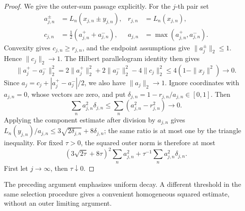 \begin{proof}
We give the outer-sum passage explicitly. For the \(j\)-th pair set
\begin{align*}
 a_{j,n}^\pm&=L_n(x_{j,n}\pm y_{j,n}),
 &r_{j,n}&=L_n(x_{j,n}),\\
 c_{j,n}&=\tfrac12(a_{j,n}^++a_{j,n}^-),
 &a_{j,n}&=\max(a_{j,n}^+,a_{j,n}^-).
\end{align*}
Convexity gives \(c_{j,n}\ge r_{j,n}\), and the endpoint assumptions
give \(\|a_j^\pm\|_2\le1\). Hence \(\|c_j\|_2\to1\). The Hilbert
parallelogram identity then gives
\[
 \|a_j^+-a_j^-\|_2^2
 =2\|a_j^+\|_2^2+2\|a_j^-\|_2^2-4\|c_j\|_2^2
 \le4(1-\|x_j\|^2)\longrightarrow0.
\]
Since \(a_j=c_j+|a_j^+-a_j^-|/2\), we also have \(\|a_j\|_2\to1\).
Ignore coordinates with \(a_{j,n}=0\), whose vectors are zero, and put
\(\delta_{j,n}=1-r_{j,n}/a_{j,n}\in[0,1]\). Then
\[
 \sum_na_{j,n}^2\delta_{j,n}
 \le\sum_n(a_{j,n}^2-r_{j,n}^2)\longrightarrow0.
\]
Applying the component estimate after division by \(a_{j,n}\) gives
\(L_n(y_{j,n})/a_{j,n}\le3\sqrt{2\delta_{j,n}}+8\delta_{j,n}\);
the same ratio is at most one by the triangle inequality. For fixed
\(\tau>0\), the squared outer norm is therefore at most
\[
 (3\sqrt{2\tau}+8\tau)^2\sum_na_{j,n}^2
 +\tau^{-1}\sum_na_{j,n}^2\delta_{j,n}.
\]
First let \(j\to\infty\), then \(\tau\downarrow0\).
\end{proof}

The preceding argument emphasizes uniform decay. A different threshold
in the same selection procedure gives a convenient homogeneous squared
estimate, without an outer limiting argument.


